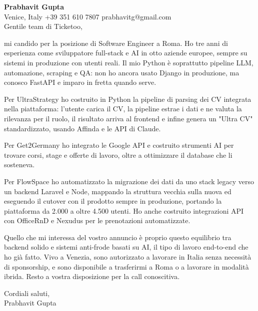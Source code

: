 \documentclass[a4paper,10.5pt]{article}
\begin{document}
\textbf{Prabhavit Gupta}\\
Venice, Italy \textbar{} +39 351 610 7807 \textbar{} prabhavitg@gmail.com\\[10pt]
Gentile team di Ticketoo,

mi candido per la posizione di Software Engineer a Roma. Ho tre anni di esperienza come sviluppatore full-stack e AI in otto aziende europee, sempre su sistemi in produzione con utenti reali. Il mio Python è soprattutto pipeline LLM, automazione, scraping e QA: non ho ancora usato Django in produzione, ma conosco FastAPI e imparo in fretta quando serve.

Per UltraStrategy ho costruito in Python la pipeline di parsing dei CV integrata nella piattaforma: l'utente carica il CV, la pipeline estrae i dati e ne valuta la rilevanza per il ruolo, il risultato arriva al frontend e infine genera un "Ultra CV" standardizzato, usando Affinda e le API di Claude.

Per Get2Germany ho integrato le Google API e costruito strumenti AI per trovare corsi, stage e offerte di lavoro, oltre a ottimizzare il database che li sosteneva.

Per FlowSpace ho automatizzato la migrazione dei dati da uno stack legacy verso un backend Laravel e Node, mappando la struttura vecchia sulla nuova ed eseguendo il cutover con il prodotto sempre in produzione, portando la piattaforma da 2.000 a oltre 4.500 utenti. Ho anche costruito integrazioni API con OfficeRnD e Nexudus per le prenotazioni automatizzate.

Quello che mi interessa del vostro annuncio è proprio questo equilibrio tra backend solido e sistemi anti-frode basati su AI, il tipo di lavoro end-to-end che ho già fatto. Vivo a Venezia, sono autorizzato a lavorare in Italia senza necessità di sponsorship, e sono disponibile a trasferirmi a Roma o a lavorare in modalità ibrida. Resto a vostra disposizione per la call conoscitiva.

Cordiali saluti,\\
Prabhavit Gupta
\end{document}
